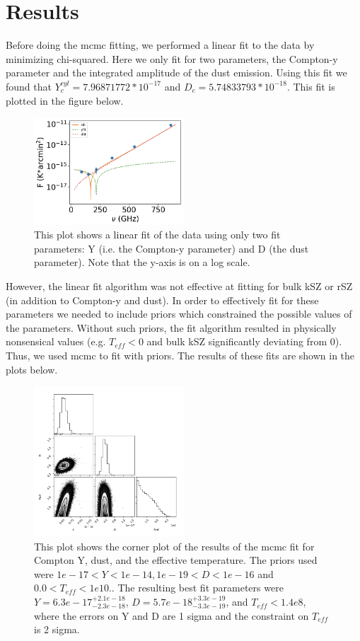 \documentclass{princeton_astro_thesis}
\begin{document}
\chapter{Results}
Before doing the mcmc fitting, we performed a linear fit to the data by minimizing chi-squared. Here we only fit for two parameters, the Compton-y parameter and the integrated amplitude of the dust emission. Using this fit we found that $Y^{cyl}_{c}=7.96871772*10^{-17}$ and $D_c=5.74833793*10^{-18}$. This fit is plotted in the figure below.

\begin{figure}[h]
\centering
\includegraphics[width=0.5\textwidth]{../redmapper_apfluxes_fitlog_earlier_version.png}
\caption{This plot shows a linear fit of the data using only two fit parameters: Y (i.e. the Compton-y parameter) and D (the dust parameter). Note that the y-axis is on a log scale.}
\end{figure}

\par However, the linear fit algorithm was not effective at fitting for bulk kSZ or rSZ (in addition to Compton-y and dust). In order to effectively fit for these parameters we needed to include priors which constrained the possible values of the parameters. Without such priors, the fit algorithm resulted in physically nonsensical values (e.g. $T_{eff}<0$ and bulk kSZ significantly deviating from 0). Thus, we used mcmc to fit with priors. The results of these fits are shown in the plots below. 

\begin{figure}[h]
\centering
\includegraphics[width=0.5\textwidth]{../CornerTeffplot.png}
\caption{This plot shows the corner plot of the results of the mcmc fit for Compton Y, dust, and the effective temperature. The priors used were $ 1e-17 < Y < 1e-14, 1e-19< D < 1e-16$ and $0.0 < T_{eff} <1e10.$. The resulting best fit parameters were $Y=6.3e-17^{+2.1e-18}_{-2.3e-18}$, $D=5.7e-18^{+3.3e-19}_{-3.3e-19}$, and $T_{eff}<1.4e8$, where the errors on Y and D are 1 sigma and the constraint on $T_{eff}$ is 2 sigma.}
\end{figure}
\end{document}
